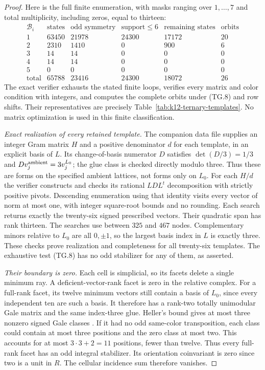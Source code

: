 \documentclass[11pt,a4paper]{article}
\theoremstyle{definition}
\begin{document}
\begin{proof}
Here is the full finite enumeration, with masks ranging over
$1,\ldots,7$ and total multiplicity, including zeros, equal to thirteen:
\[
\begin{array}{c|r|r|r|r|r}
\mathcal B_i&\text{states}&\text{odd symmetry}&\text{support}\le6
       &\text{remaining states}&\text{orbits}\\\hline
1&63450&21978&24300&17172&20\\
2&2310&1410&0&900&6\\
3&14&14&0&0&0\\
4&14&14&0&0&0\\
5&0&0&0&0&0\\\hline
\text{total}&65788&23416&24300&18072&26
\end{array}                                                     \tag{TG.9}
\]
The exact verifier exhausts the stated finite loops, verifies every
matrix and color condition with integers, and computes the complete
orbits under (TG.8) and row shifts. Their representatives are precisely
Table~\ref{tab:k12-ternary-templates}. No matrix optimization is used
in this finite classification.

\emph{Exact realization of every retained template.}
The companion data file supplies an integer Gram matrix $H$ and a
positive denominator $d$ for each template, in an explicit basis of
$L$. Its change-of-basis numerator $D$ satisfies
$\det(D/3)=1/3$ and $Dv_j^{\rm ambient}=3v_j^{L_0}$; the glue class
is checked directly modulo three. Thus these are forms on the
specified ambient lattices, not forms only on $L_0$.
For each $H/d$ the verifier constructs and checks its rational
$LDL^t$ decomposition with strictly positive pivots. Descending
enumeration using that identity visits every vector of norm at most
one, with integer square-root bounds and no rounding. Each search
returns exactly the twenty-six signed prescribed vectors. Their
quadratic span has rank thirteen. The searches use between $325$
and $467$ nodes. Complementary minors relative to $L_0$ are all
$0,\pm1$, so the largest basis index in $L$ is exactly three.
These checks prove realization and completeness for all twenty-six
templates. The exhaustive test (TG.8) has no odd stabilizer for any
of them, as asserted.

\emph{Their boundary is zero.}
Each cell is simplicial, so its facets delete a single minimum ray.
A deficient-vector-rank facet is zero in the relative complex.
For a full-rank facet, its twelve minimum vectors still contain a
basis of $L_0$, since every independent ten are such a basis.
It therefore has a rank-two totally unimodular Gale matrix and
the same index-three glue. Heller's bound gives at most three
nonzero signed Gale classes
\cite[\S1, the formula $h(1,m)=m^2+m+1$]{AverkovSchymura2024}.
If it had no odd same-color transposition, each class could contain
at most three positions and the zero class at most two. This accounts
for at most $3\cdot3+2=11$ positions, fewer than twelve.
Thus every full-rank facet has an odd integral stabilizer.
Its orientation coinvariant is zero since two is a unit in $R$.
The cellular incidence sum therefore vanishes.


\end{proof}
\end{document}
